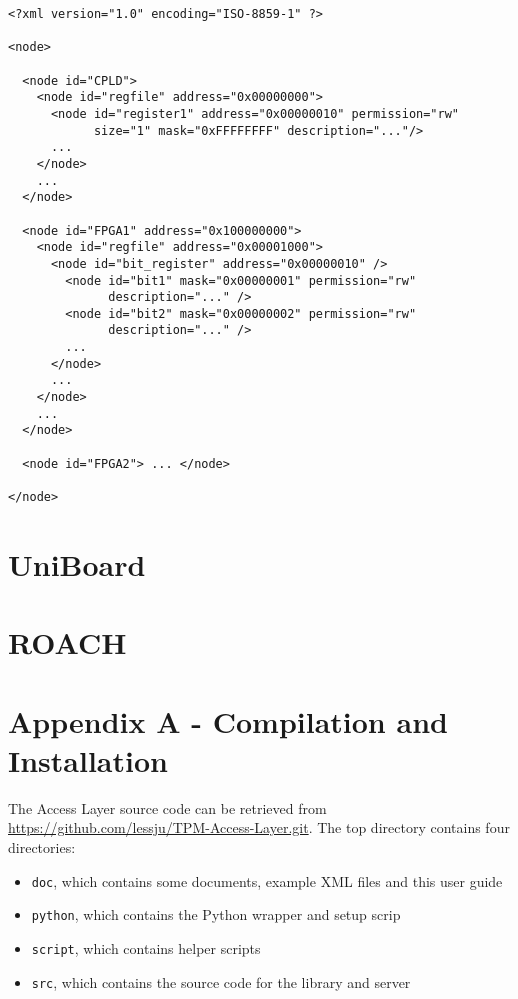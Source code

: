 \documentclass[a4paper,11pt]{article}
\begin{document}
\begin{lstlisting}[caption=XML memory map]
<?xml version="1.0" encoding="ISO-8859-1" ?>

<node>

  <node id="CPLD">
    <node id="regfile" address="0x00000000">
      <node id="register1" address="0x00000010" permission="rw" 
            size="1" mask="0xFFFFFFFF" description="..."/>
      ...
    </node>
    ...
  </node>
  
  <node id="FPGA1" address="0x100000000">
    <node id="regfile" address="0x00001000">
      <node id="bit_register" address="0x00000010" />
        <node id="bit1" mask="0x00000001" permission="rw" 
              description="..." />
        <node id="bit2" mask="0x00000002" permission="rw" 
              description="..." />
        ...
      </node>
      ...
    </node> 
    ...
  </node>
  
  <node id="FPGA2"> ... </node>
  
</node>
\end{lstlisting}

\section{UniBoard}

\section{ROACH}

\pagebreak

\section*{Appendix A - Compilation and Installation}

The Access Layer source code can be retrieved from 
\url{https://github.com/lessju/TPM-Access-Layer.git}. The top directory 
contains four directories: 
\begin{itemize}
 \item \texttt{doc}, which contains some documents, example XML files and this 
user guide
 \item \texttt{python}, which contains the Python wrapper and setup scrip
 \item \texttt{script}, which contains helper scripts
 \item \texttt{src}, which contains the source code for the library and server
\end{itemize}
\end{document}
